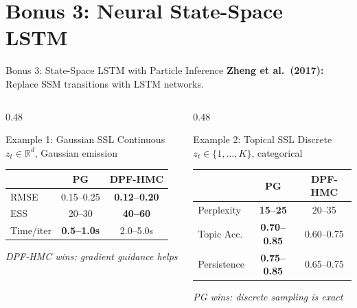\documentclass[aspectratio=169,10pt]{beamer}
\newcommand{\R}{\mathbb{R}}
\newcommand{\remark}[1]{\textcolor{jpmaccent}{\textit{#1}}}
\begin{document}
\section{Bonus 3: Neural State-Space LSTM}

\begin{frame}{Bonus 3: State-Space LSTM with Particle Inference}
\textbf{Zheng et al.\ (2017):} Replace SSM transitions with LSTM networks.

\vspace{0.3em}
\begin{columns}[T]
\begin{column}{0.48\textwidth}
\begin{block}{Example 1: Gaussian SSL}
{\scriptsize Continuous $z_t \in \R^d$, Gaussian emission}
\begin{table}
\centering
\tiny
\begin{tabular}{@{}lcc@{}}
  \toprule
  & \textbf{PG} & \textbf{DPF-HMC} \\
  \midrule
  RMSE & 0.15--0.25 & \textbf{0.12--0.20} \\
  ESS & 20--30 & \textbf{40--60} \\
  Time/iter & \textbf{0.5--1.0s} & 2.0--5.0s \\
  \bottomrule
\end{tabular}
\end{table}
\remark{DPF-HMC wins: gradient guidance helps}
\end{block}
\end{column}
\begin{column}{0.48\textwidth}
\begin{block}{Example 2: Topical SSL}
{\scriptsize Discrete $z_t \in \{1,\ldots,K\}$, categorical}
\begin{table}
\centering
\tiny
\begin{tabular}{@{}lcc@{}}
  \toprule
  & \textbf{PG} & \textbf{DPF-HMC} \\
  \midrule
  Perplexity & \textbf{15--25} & 20--35 \\
  Topic Acc. & \textbf{0.70--0.85} & 0.60--0.75 \\
  Persistence & \textbf{0.75--0.85} & 0.65--0.75 \\
  \bottomrule
\end{tabular}
\end{table}
\remark{PG wins: discrete sampling is exact}
\end{block}
\end{column}
\end{columns}


\end{frame}
\end{document}
